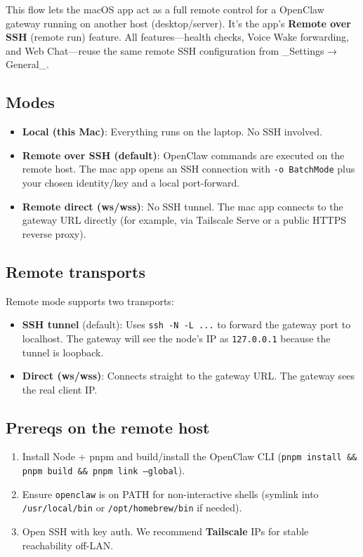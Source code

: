 This flow lets the macOS app act as a full remote control for a OpenClaw gateway running on another host (desktop/server). It’s the app’s \textbf{Remote over SSH} (remote run) feature. All features—health checks, Voice Wake forwarding, and Web Chat—reuse the same remote SSH configuration from \_Settings → General\_.

\subsection{Modes}


\begin{itemize}
  \item \textbf{Local (this Mac)}: Everything runs on the laptop. No SSH involved.
  \item \textbf{Remote over SSH (default)}: OpenClaw commands are executed on the remote host. The mac app opens an SSH connection with \texttt{-o BatchMode} plus your chosen identity/key and a local port-forward.
  \item \textbf{Remote direct (ws/wss)}: No SSH tunnel. The mac app connects to the gateway URL directly (for example, via Tailscale Serve or a public HTTPS reverse proxy).
\end{itemize}


\subsection{Remote transports}


Remote mode supports two transports:

\begin{itemize}
  \item \textbf{SSH tunnel} (default): Uses \texttt{ssh -N -L ...} to forward the gateway port to localhost. The gateway will see the node’s IP as \texttt{127.0.0.1} because the tunnel is loopback.
  \item \textbf{Direct (ws/wss)}: Connects straight to the gateway URL. The gateway sees the real client IP.
\end{itemize}


\subsection{Prereqs on the remote host}


\begin{enumerate}
  \item Install Node + pnpm and build/install the OpenClaw CLI (\texttt{pnpm install \&\& pnpm build \&\& pnpm link --global}).
  \item Ensure \texttt{openclaw} is on PATH for non-interactive shells (symlink into \texttt{/usr/local/bin} or \texttt{/opt/homebrew/bin} if needed).
  \item Open SSH with key auth. We recommend \textbf{Tailscale} IPs for stable reachability off-LAN.
\end{enumerate}


